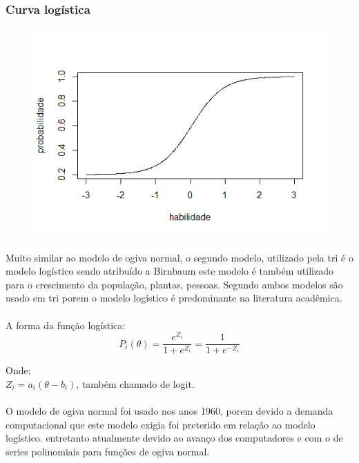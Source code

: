    \subsubsection{Curva logística}
    \begin{figure}[!h]
    	\centering
    	\includegraphics[width=0.6\linewidth]{img/Rplo}
    	\caption{}
    	\label{fig:rplo}
    \end{figure}
    \paragraph{}
        Muito similar ao modelo de ogiva normal, o segundo modelo, utilizado pela tri é o modelo logístico sendo atribuído a Birnbaum este modelo é também utilizado para o crescimento da população, plantas, pessoas. Segundo \cite{Baker} ambos modelos são usado em tri porem o modelo logístico é predominante na literatura acadêmica.
    \paragraph{}
        A forma da função logística:
    \begin{equation}
        P_i(\theta) = \displaystyle\frac{e^{Z_i}}{1 + e^{Z_i}} = \displaystyle\frac{1}{1 + e^{-Z_i}}
    \end{equation}
    
    Onde:\\
    $Z_i = a_i(\theta - b_i)$, também chamado de logit. 
    \paragraph{}
        O modelo de ogiva normal foi usado nos anos 1960, porem devido a demanda computacional que este modelo exigia foi preterido em relação ao modelo logístico. entretanto atualmente devido ao avanço dos computadores e com o de series polinomiais para funções de ogiva normal.
